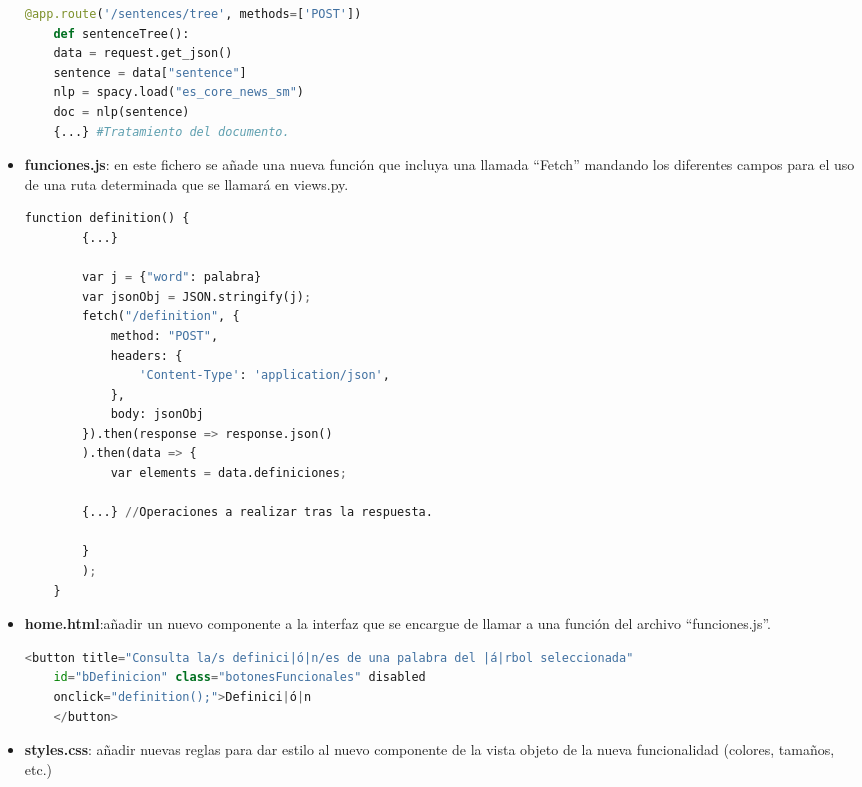 \begin{itemize}
\begin{lstlisting}[language=python,firstnumber=1]
	@app.route('/sentences/tree', methods=['POST'])
	def sentenceTree():
	data = request.get_json()
	sentence = data["sentence"]
	nlp = spacy.load("es_core_news_sm")
	doc = nlp(sentence)
	{...} #Tratamiento del documento.
\end{lstlisting}

	
	\item \textbf{funciones.js}: en este fichero se añade una nueva función que incluya una llamada ``Fetch'' mandando los diferentes campos para el uso de una ruta determinada que se llamará en views.py. 
	
	\begin{lstlisting}[language=python,firstnumber=1]
	function definition() {
		{...}
		
		var j = {"word": palabra}
		var jsonObj = JSON.stringify(j);
		fetch("/definition", {
			method: "POST",
			headers: {
				'Content-Type': 'application/json',
			},
			body: jsonObj
		}).then(response => response.json()
		).then(data => {
			var elements = data.definiciones;
			
		{...} //Operaciones a realizar tras la respuesta.
			
		}
		);		
	}
	\end{lstlisting}
	
	
	
	
	
	\item \textbf{home.html}:añadir un nuevo componente a la interfaz que se encargue de llamar a una función del archivo ``funciones.js''. 
		\begin{lstlisting}[language=python,firstnumber=1]
	<button title="Consulta la/s definici|ó|n/es de una palabra del |á|rbol seleccionada"
	id="bDefinicion" class="botonesFuncionales" disabled
	onclick="definition();">Definici|ó|n
	</button>
	\end{lstlisting}
	\item \textbf{styles.css}: añadir nuevas reglas para dar estilo al nuevo componente de la vista objeto de la nueva funcionalidad (colores, tamaños, etc.)
\end{itemize}
